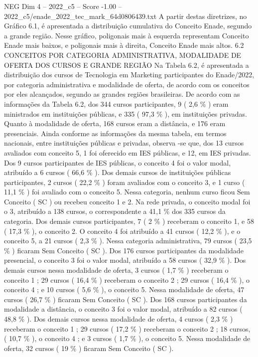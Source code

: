 \begin{textsample}{NEG Dim 4 – 2022\_c5 – Score -1.00 – 2022\_c5/enade\_2022\_tec\_mark\_64d0806439.txt}
A partir destas diretrizes, no Gráfico 6.1, é apresentada a distribuição cumulativa do Conceito Enade, segundo a grande região.
Nesse gráfico, poligonais mais à esquerda representam Conceito Enade mais baixos, e poligonais mais à direita, Conceito Enade mais altos. 6.2 CONCEITOS POR CATEGORIA ADMINISTRATIVA, MODALIDADE DE OFERTA DOS CURSOS E GRANDE REGIÃO Na Tabela 6.2, é apresentada a distribuição dos cursos de Tecnologia em Marketing participantes do Enade/2022, por categoria administrativa e modalidade de oferta, de acordo com os conceitos por eles alcançados, segundo as grandes regiões brasileiras.
De acordo com as informações da Tabela 6.2, dos 344 cursos participantes, 9 ( 2,6 \% ) eram ministrados em instituições públicas, e 335 ( 97,3 \% ), em instituições privadas.
Quanto à modalidade de oferta, 168 cursos eram a distância, e 176 eram presenciais.
Ainda conforme as informações da mesma tabela, em termos nacionais, entre instituições públicas e privadas, observa -se que, dos 13 cursos avaliados com conceito 5, 1 foi oferecido em IES públicas, e 12, em IES privadas.
Dos 9 cursos participantes de IES públicas, o conceito 4 foi o valor modal, atribuído a 6 cursos ( 66,6 \% ).
Dos demais cursos de instituições públicas participantes, 2 cursos ( 22,2 \% ) foram avaliados com o conceito 3, e 1 curso ( 11,1 \% ) foi avaliado com o conceito 5.
Nessa categoria, nenhum curso ficou Sem Conceito ( SC ) ou recebeu conceito 1 e 2.
Na rede privada, o conceito modal foi o 3, atribuído a 138 cursos, o correspondente a 41,1 \% dos 335 cursos da categoria.
Dos demais cursos participantes, 7 ( 2 \% ) receberam o conceito 1, e 58 ( 17,3 \% ), o conceito 2.
O conceito 4 foi atribuído a 41 cursos ( 12,2 \% ), e o conceito 5, a 21 cursos ( 2,3 \% ).
Nessa categoria administrativa, 79 cursos ( 23,5 \% ) ficaram Sem Conceito ( SC ).
Dos 176 cursos participantes da modalidade presencial, o conceito 3 foi o valor modal, atribuído a 58 cursos ( 32,9 \% ).
Dos demais cursos nessa modalidade de oferta, 3 cursos ( 1,7 \% ) receberam o conceito 1 ; 29 cursos ( 16,4 \% ) receberam o conceito 2 ; 29 cursos ( 16,4 \% ), o conceito 4 ; e 10 cursos ( 5,6 \% ), o conceito 5.
Nessa modalidade de oferta, 47 cursos ( 26,7 \% ) ficaram Sem Conceito ( SC ).
Dos 168 cursos participantes da modalidade a distância, o conceito 3 foi o valor modal, atribuído a 82 cursos ( 48,8 \% ).
Dos demais cursos nessa modalidade de oferta, 4 cursos ( 2,3 \% ) receberam o conceito 1 ; 29 cursos ( 17,2 \% ) receberam o conceito 2 ; 18 cursos, ( 10,7 \% ), o conceito 4 ; e 3 cursos ( 1,7 \% ), o conceito 5.
Nessa modalidade de oferta, 32 cursos ( 19 \% ) ficaram Sem Conceito ( SC ).

\end{textsample}

